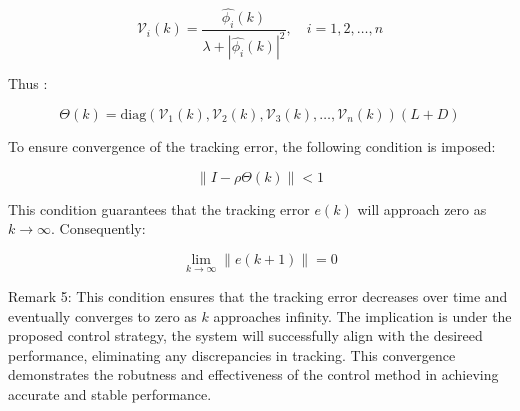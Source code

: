 \documentclass[journal,onecolumn]{IEEEtran}
\begin{document}






\[
\mathcal{V}_i(k) = \frac{\hat{\phi_i}(k)}{\lambda + |\hat{\phi_i}(k)|^2}, \quad i = 1, 2, \dots, n
\]

Thus :

\[
\Theta(k) = \text{diag}(\mathcal{V}_1(k), \mathcal{V}_2(k), \mathcal{V}_3(k), \dots, \mathcal{V}_n(k)) (L + D)
\]

To ensure convergence of the tracking error, the following condition is imposed:

\begin{equation}
    \label{model 31}
    \|I - \rho \Theta(k)\| < 1
\end{equation}

This condition guarantees that the tracking error \(e(k)\) will approach zero as \(k \to \infty\). Consequently:

\[
\lim_{k \to \infty} \|e(k+1)\| = 0
\]


Remark 5: This condition ensures that the tracking error decreases over time and eventually converges to zero as $k$ approaches infinity. The implication is under the proposed control strategy, the system will successfully align with the desireed performance, eliminating any discrepancies in tracking. This convergence demonstrates the robutness and effectiveness of the control method in achieving accurate and stable performance.







\end{document}
